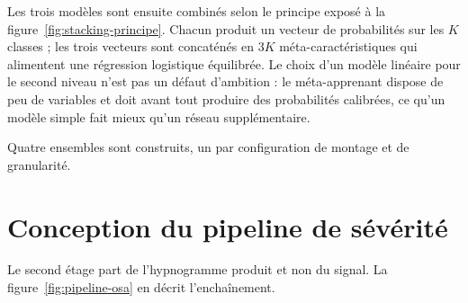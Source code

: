 Les trois modèles sont ensuite combinés selon le principe exposé à la
figure~\ref{fig:stacking-principe}. Chacun produit un vecteur de probabilités sur les
$K$ classes ; les trois vecteurs sont concaténés en $3K$ méta-caractéristiques qui
alimentent une régression logistique équilibrée. Le choix d'un modèle linéaire pour le
second niveau n'est pas un défaut d'ambition : le méta-apprenant dispose de peu de
variables et doit avant tout produire des probabilités calibrées, ce qu'un modèle
simple fait mieux qu'un réseau supplémentaire.

Quatre ensembles sont construits, un par configuration de montage et de granularité.

\section{Conception du pipeline de sévérité}

Le second étage part de l'hypnogramme produit et non du signal. La
figure~\ref{fig:pipeline-osa} en décrit l'enchaînement.


